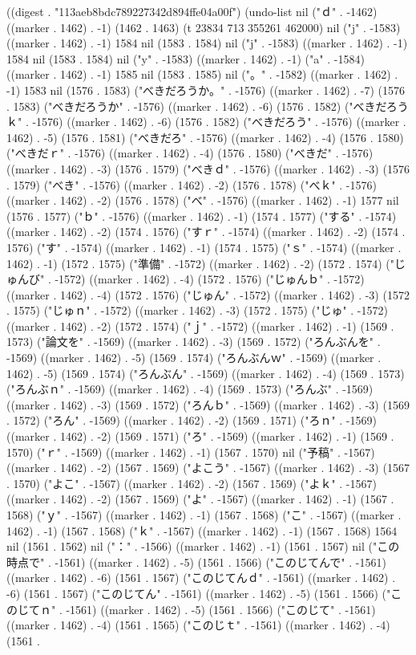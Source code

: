 
((digest . "113aeb8bdc789227342d894ffe04a00f") (undo-list nil ("ｄ" . -1462) ((marker . 1462) . -1) (1462 . 1463) (t 23834 713 355261 462000) nil ("j" . -1583) ((marker . 1462) . -1) 1584 nil (1583 . 1584) nil ("j" . -1583) ((marker . 1462) . -1) 1584 nil (1583 . 1584) nil ("y" . -1583) ((marker . 1462) . -1) ("a" . -1584) ((marker . 1462) . -1) 1585 nil (1583 . 1585) nil ("。" . -1582) ((marker . 1462) . -1) 1583 nil (1576 . 1583) ("べきだろうか。" . -1576) ((marker . 1462) . -7) (1576 . 1583) ("べきだろうか" . -1576) ((marker . 1462) . -6) (1576 . 1582) ("べきだろうｋ" . -1576) ((marker . 1462) . -6) (1576 . 1582) ("べきだろう" . -1576) ((marker . 1462) . -5) (1576 . 1581) ("べきだろ" . -1576) ((marker . 1462) . -4) (1576 . 1580) ("べきだｒ" . -1576) ((marker . 1462) . -4) (1576 . 1580) ("べきだ" . -1576) ((marker . 1462) . -3) (1576 . 1579) ("べきｄ" . -1576) ((marker . 1462) . -3) (1576 . 1579) ("べき" . -1576) ((marker . 1462) . -2) (1576 . 1578) ("べｋ" . -1576) ((marker . 1462) . -2) (1576 . 1578) ("べ" . -1576) ((marker . 1462) . -1) 1577 nil (1576 . 1577) ("ｂ" . -1576) ((marker . 1462) . -1) (1574 . 1577) ("する" . -1574) ((marker . 1462) . -2) (1574 . 1576) ("すｒ" . -1574) ((marker . 1462) . -2) (1574 . 1576) ("す" . -1574) ((marker . 1462) . -1) (1574 . 1575) ("ｓ" . -1574) ((marker . 1462) . -1) (1572 . 1575) ("準備" . -1572) ((marker . 1462) . -2) (1572 . 1574) ("じゅんび" . -1572) ((marker . 1462) . -4) (1572 . 1576) ("じゅんｂ" . -1572) ((marker . 1462) . -4) (1572 . 1576) ("じゅん" . -1572) ((marker . 1462) . -3) (1572 . 1575) ("じゅｎ" . -1572) ((marker . 1462) . -3) (1572 . 1575) ("じゅ" . -1572) ((marker . 1462) . -2) (1572 . 1574) ("ｊ" . -1572) ((marker . 1462) . -1) (1569 . 1573) ("論文を" . -1569) ((marker . 1462) . -3) (1569 . 1572) ("ろんぶんを" . -1569) ((marker . 1462) . -5) (1569 . 1574) ("ろんぶんｗ" . -1569) ((marker . 1462) . -5) (1569 . 1574) ("ろんぶん" . -1569) ((marker . 1462) . -4) (1569 . 1573) ("ろんぶｎ" . -1569) ((marker . 1462) . -4) (1569 . 1573) ("ろんぶ" . -1569) ((marker . 1462) . -3) (1569 . 1572) ("ろんｂ" . -1569) ((marker . 1462) . -3) (1569 . 1572) ("ろん" . -1569) ((marker . 1462) . -2) (1569 . 1571) ("ろｎ" . -1569) ((marker . 1462) . -2) (1569 . 1571) ("ろ" . -1569) ((marker . 1462) . -1) (1569 . 1570) ("ｒ" . -1569) ((marker . 1462) . -1) (1567 . 1570) nil ("予稿" . -1567) ((marker . 1462) . -2) (1567 . 1569) ("よこう" . -1567) ((marker . 1462) . -3) (1567 . 1570) ("よこ" . -1567) ((marker . 1462) . -2) (1567 . 1569) ("よｋ" . -1567) ((marker . 1462) . -2) (1567 . 1569) ("よ" . -1567) ((marker . 1462) . -1) (1567 . 1568) ("ｙ" . -1567) ((marker . 1462) . -1) (1567 . 1568) ("こ" . -1567) ((marker . 1462) . -1) (1567 . 1568) ("ｋ" . -1567) ((marker . 1462) . -1) (1567 . 1568) 1564 nil (1561 . 1562) nil ("：" . -1566) ((marker . 1462) . -1) (1561 . 1567) nil ("この時点で" . -1561) ((marker . 1462) . -5) (1561 . 1566) ("このじてんで" . -1561) ((marker . 1462) . -6) (1561 . 1567) ("このじてんｄ" . -1561) ((marker . 1462) . -6) (1561 . 1567) ("このじてん" . -1561) ((marker . 1462) . -5) (1561 . 1566) ("このじてｎ" . -1561) ((marker . 1462) . -5) (1561 . 1566) ("このじて" . -1561) ((marker . 1462) . -4) (1561 . 1565) ("このじｔ" . -1561) ((marker . 1462) . -4) (1561 . 